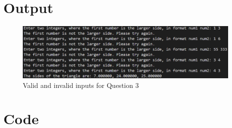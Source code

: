 \documentclass{article}
\begin{document}
\begin{flushleft}
	\section{Output}
	\begin{figure}[!h]
		\begin{centering}
			\includegraphics[width=\linewidth]{Q3Output.png}
			\caption{Valid and invalid inputs for Question 3}
		\end{centering}
	\end{figure}
	\section{Code}
	
\end{flushleft}
\end{document}

